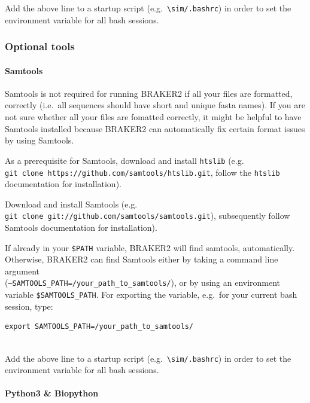 \documentclass[]{article}
\let\oldparagraph\paragraph
\renewcommand{\paragraph}[1]{\oldparagraph{#1}\mbox{}}
\begin{document}
Add the above line to a startup script
(e.g.~\texttt{\textbackslash{}sim/.bashrc}) in order to set the
environment variable for all bash sessions.

\hypertarget{optional-tools}{\subsubsection{Optional
tools}\label{optional-tools}}

\paragraph{Samtools}\label{samtools}

Samtools is not required for running BRAKER2 if all your files are
formatted, correctly (i.e.~all sequences should have short and unique
fasta names). If you are not sure whether all your files are fomatted
correctly, it might be helpful to have Samtools installed because
BRAKER2 can automatically fix certain format issues by using Samtools.

As a prerequisite for Samtools, download and install \texttt{htslib}
(e.g.~ \texttt{git\ clone\ https://github.com/samtools/htslib.git},
follow the \texttt{htslib} documentation for installation).

Download and install Samtools (e.g.
\texttt{git\ clone\ git://github.com/samtools/samtools.git}),
subsequently follow Samtools documentation for installation).

If already in your \texttt{\$PATH} variable, BRAKER2 will find samtools,
automatically. Otherwise, BRAKER2 can find Samtools either by taking a
command line argument\\
(\texttt{–SAMTOOLS\_PATH=/your\_path\_to\_samtools/}), or by using an
environment variable \texttt{\$SAMTOOLS\_PATH}. For exporting the
variable, e.g.~for your current bash session, type:

\begin{verbatim}
export SAMTOOLS_PATH=/your_path_to_samtools/
    
\end{verbatim}

Add the above line to a startup script
(e.g.~\texttt{\textbackslash{}sim/.bashrc}) in order to set the
environment variable for all bash sessions.

\paragraph{Python3 \& Biopython}\label{python3-biopython}
\end{document}
